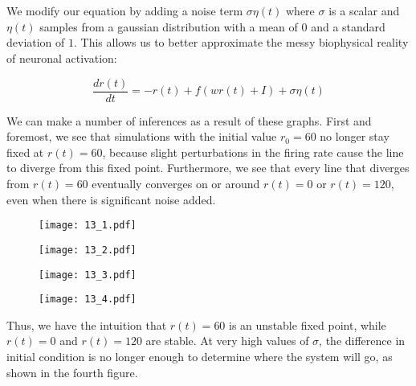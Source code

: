 \documentclass{article}
\begin{document}
\section{}
We modify our equation by adding a noise term $\sigma \eta(t)$ where $\sigma$ is a scalar and $\eta(t)$ samples from a gaussian distribution with a mean of $0$ and a standard deviation of $1$. This allows us to better approximate the messy biophysical reality of neuronal activation:

\begin{equation}
    \frac{dr(t)}{dt} = -r(t) + f(wr(t) + I) + \sigma \eta(t)
\end{equation}
\vspace{.1em}

We can make a number of inferences as a result of these graphs. First and foremost, we see that simulations with the initial value $r_0 = 60$ no longer stay fixed at $r(t) = 60$, because slight perturbations in the firing rate cause the line to diverge from this fixed point. Furthermore, we see that every line that diverges from $r(t) = 60$ eventually converges on or around $r(t) = 0$ or $r(t) = 120$, even when there is significant noise added. 

\begin{figure}
    \centering
    \begin{minipage}{0.48\textwidth}
        \centering
        \texttt{[image: 13\_1.pdf]} %
    \end{minipage}\hfill
    \begin{minipage}{0.48\textwidth}
        \centering
        \texttt{[image: 13\_2.pdf]} %
    \end{minipage}
\end{figure}

\begin{figure}
    \centering
    \begin{minipage}{0.48\textwidth}
        \centering
        \texttt{[image: 13\_3.pdf]} %
    \end{minipage}\hfill
    \begin{minipage}{0.48\textwidth}
        \centering
        \texttt{[image: 13\_4.pdf]} %
    \end{minipage}
\end{figure}

Thus, we have the intuition that $r(t) = 60$ is an unstable fixed point, while $r(t) = 0$ and $r(t) = 120$ are stable. At very high values of $\sigma$, the difference in initial condition is no longer enough to determine where the system will go, as shown in the fourth figure.
\vspace{1em}
\end{document}
